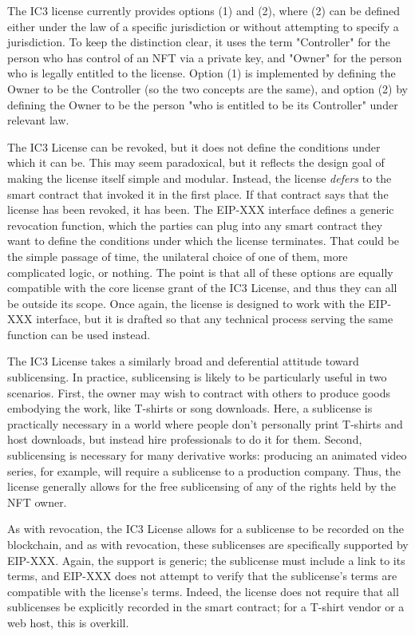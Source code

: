 \documentclass{article}
\begin{document}
The IC3 license currently provides options (1) and (2), where (2) can be defined either under the law of a specific jurisdiction or without attempting to specify a jurisdiction. To keep the distinction clear, it uses the term "Controller" for the person who has control of an NFT via a private key, and "Owner" for the person who is legally entitled to the license. Option (1) is implemented by defining the Owner to be the Controller (so the two concepts are the same), and option (2) by defining the Owner to be the person "who is entitled to be its Controller" under relevant law.

The IC3 License can be revoked, but it does not define the conditions under which it can be. This may seem paradoxical, but it reflects the design goal of making the license itself simple and modular. Instead, the license \emph{defers} to the smart contract that invoked it in the first place. If that contract says that the license has been revoked, it has been. The EIP-XXX interface defines a generic revocation function, which the parties can plug into any smart contract they want to define the conditions under which the license terminates. That could be the simple passage of time, the unilateral choice of one of them, more complicated logic, or nothing. The point is that all of these options are equally compatible with the core license grant of the IC3 License, and thus they can all be outside its scope. Once again, the license is designed to work with the EIP-XXX interface, but it is drafted so that any technical process serving the same function can be used instead.

The IC3 License takes a similarly broad and deferential attitude toward sublicensing. In practice, sublicensing is likely to be particularly useful in two scenarios. First, the owner may wish to contract with others to produce goods embodying the work, like T-shirts or song downloads. Here, a sublicense is practically necessary in a world where people don't personally print T-shirts and host downloads, but instead hire professionals to do it for them. Second, sublicensing is necessary for many derivative works: producing an animated video series, for example, will require a sublicense to a production company. Thus, the license generally allows for the free sublicensing of any of the rights held by the NFT owner.

As with revocation, the IC3 License allows for a sublicense to be recorded on the blockchain, and as with revocation, these sublicenses are specifically supported by EIP-XXX. Again, the support is generic; the sublicense must include a link to its terms, and EIP-XXX does not attempt to verify that the sublicense's terms are compatible with the license's terms. Indeed, the license does not require that all sublicenses be explicitly recorded in the smart contract; for a T-shirt vendor or a web host, this is overkill. 
\end{document}

